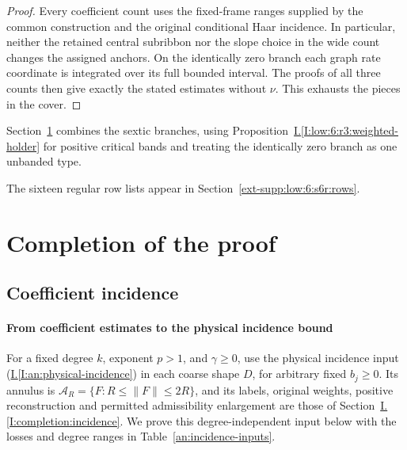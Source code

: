 \documentclass[11pt]{amsart}
\theoremstyle{definition}
\theoremstyle{remark}
\numberwithin{equation}{section}
\newcommand{\partIref}[1]{\hyperref[I:#1]{I.\ref*{I:#1}}}
\newcommand{\partIeqref}[1]{\textup{(\partIref{#1})}}
\begin{document}
\begin{proof}
Every coefficient count uses the fixed-frame ranges supplied by the common construction and the original conditional Haar incidence. In particular, neither the retained central subribbon nor the slope choice in the wide count changes the assigned anchors. On the identically zero branch each graph rate coordinate is integrated over its full bounded interval. The proofs of all three counts then give exactly the stated estimates without $\nu$. This exhausts the pieces in the cover.
\end{proof}

Section~\ref{an:assembly} combines the sextic branches, using Proposition~\partIref{low:6:r3:weighted-holder} for positive critical bands and treating the identically zero branch as one unbanded type.

The sixteen regular row lists appear in Section~\ref{ext-supp:low:6:s6r:rows}.


\section{Completion of the proof}\label{an:assembly}\label{an:assembly-section}

\subsection{Coefficient incidence}\label{completion:incidence}\label{an:coefficient-assembly}


\paragraph{From coefficient estimates to the physical incidence bound}

For a fixed degree $k$, exponent $p>1$, and $\gamma\ge0$, use the physical incidence input \partIeqref{an:physical-incidence} in each coarse shape $D$, for arbitrary fixed $b_j\ge0$. Its annulus is $\mathcal A_R=\{F:R\le\|F\|\le2R\}$, and its labels, original weights, positive reconstruction and permitted admissibility enlargement are those of Section~\partIref{completion:incidence}. We prove this degree-independent input below with the losses and degree ranges in Table~\ref{an:incidence-inputs}.
\end{document}
